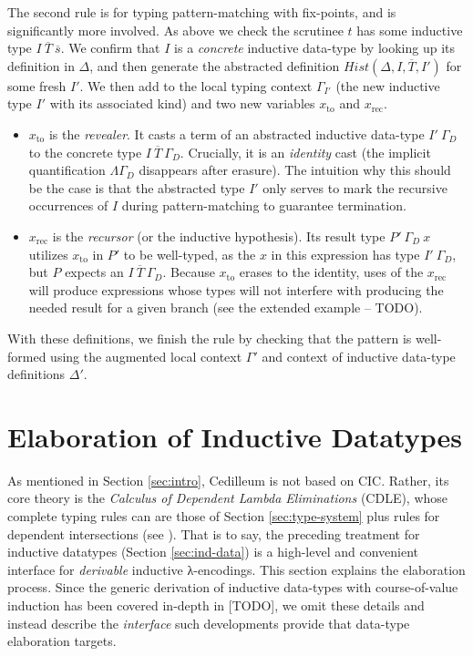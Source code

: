 \documentclass{article}
\newcommand{\vars}[1]{{\overline{#1}}}
\begin{document}
The second rule is for typing pattern-matching with fix-points, and is
significantly more involved. As above we check the scrutinee $t$ has some
inductive type $I\ \vars{T}\ \vars{s}$. We confirm that $I$ is a
\textit{concrete} inductive data-type by looking up its definition in $\Delta$,
and then generate the abstracted definition $Hist(\Delta,I,\vars{T},I')$ for some fresh
$I'$. We then add to the local typing context $\Gamma_{I'}$ (the new inductive
type $I'$ with its associated kind) and two new variables $x_{\text{to}}$ and
$x_{\text{rec}}$.

\begin{itemize}
\item $x_{\text{to}}$ is the \textit{revealer}. It casts a term of an abstracted inductive
  data-type $I'\ \Gamma_D$ to the concrete type $I\ \vars{T}\ \Gamma_D$.
  Crucially, it is an \textit{identity} cast (the implicit quantification
  $\Lambda \Gamma_D$ disappears after erasure). The intuition why this should be
  the case is that the abstracted type $I'$ only serves to mark the recursive
  occurrences of $I$ during pattern-matching to guarantee termination.
\item $x_{\text{rec}}$ is the \textit{recursor} (or the inductive hypothesis).
  Its result type $P'\ \Gamma_D\ x$ utilizes $x_{\text{to}}$ in $P'$ to be
  well-typed, as the $x$ in this expression has type $I'\ \Gamma_D$, but $P$
  expects an $I\ \vars{T}\ \Gamma_D$. Because $x_{\text{to}}$ erases to the identity, uses of the
  $x_{\text{rec}}$ will produce expressions whose types will not interfere with
  producing the needed result for a given branch (see the extended example --
  TODO).
\end{itemize}

\noindent With these definitions, we finish the rule by checking that the
pattern is well-formed using the augmented local context $\Gamma'$ and context
of inductive data-type definitions $\Delta'$.

\section{Elaboration of Inductive Datatypes}
As mentioned in Section \ref{sec:intro}, Cedilleum is not based on CIC. Rather,
its core theory is the \textit{Calculus of Dependent Lambda Eliminations}
(CDLE), whose complete typing rules can are those of Section
\ref{sec:type-system} plus rules for dependent intersections (see
\cite{St18_Cedille-Syntax-Semantics}). That is to say, the preceding treatment
for inductive datatypes (Section \ref{sec:ind-data}) is a high-level and
convenient interface for \textit{derivable} inductive λ-encodings. This section
explains the elaboration process. Since the generic derivation of inductive
data-types with course-of-value induction has been covered in-depth in [TODO],
we omit these details and instead describe the \textit{interface} such
developments provide that data-type elaboration targets.
\end{document}
